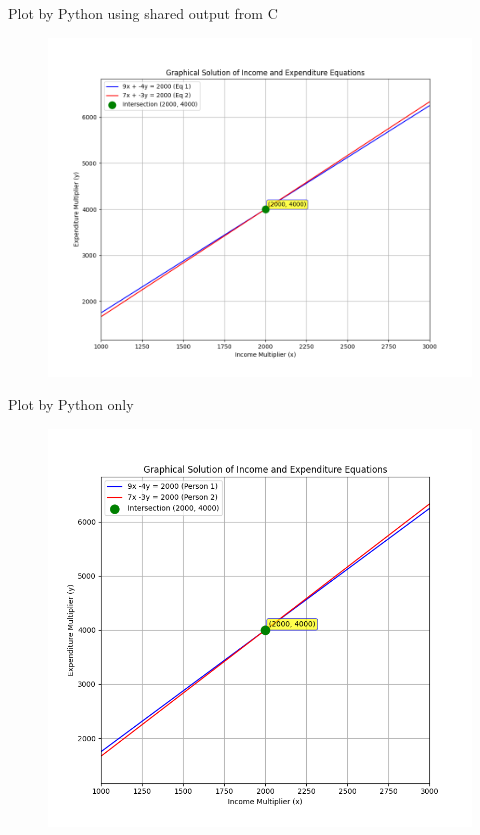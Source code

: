 \documentclass{beamer}
\begin{document}
\begin{frame}{Plot by Python using shared output from C}
\begin{figure}[H]
\centering
\includegraphics[width=0.8\columnwidth]{../figs/fig1.png}
\caption{}
\label{fig:1}
\end{figure}
\end{frame}

\begin{frame}{Plot by Python only}
\begin{figure}[H]
\centering
\includegraphics[width=0.7\columnwidth]{../figs/fig2.png}
\caption{}
\label{fig:2}
\end{figure}
\end{frame}
\end{document}
